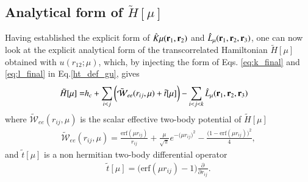 \documentclass[aip,jcp,reprint,noshowkeys,superscriptaddress]{revtex4-1}
\newcommand{\deriv}[3]{\frac{\partial^{#3} #1}{\partial {#2}^{#3}}}
\newcommand{\bri}[1]{{\bf r}_{#1}}
\begin{document}
\subsection{Analytical form of $\tilde{H}[\mu]$}
Having established the explicit form of $\hat{K}\mu(\bri{1},\bri{2})$ and $\hat{L}_\mu(\bri{1},\bri{2},\bri{3})$, one can now 
look at the explicit analytical form of the transcorrelated Hamiltonian $\tilde{H}[\mu]$ obtained with $u(r_{12};\mu)$,  
which, by injecting the form of Eqs. \eqref{eq:k_final} and \eqref{eq:l_final} in Eq.\eqref{ht_def_gu}, gives
\begin{equation}
  \begin{aligned}
 \label{eq:exp_ht_mu}
   \tilde{H}[\mu] = & h_c + \sum_{i<j} \bigg( \tilde{\mathcal{W}}_{ee}(r_{ij},\mu) + \tilde{t}[\mu] \bigg) - \sum_{i<j<k} \hat{L}_\mu(\bri{1},\bri{2},\bri{3})
  \end{aligned}
\end{equation}
where $ \tilde{\mathcal{W}}_{ee}(r_{ij},\mu)$ is the scalar effective two-body potential of  $\tilde{H}[\mu]$
\begin{equation}
 \begin{aligned}
 \tilde{\mathcal{W}}_{ee}(r_{ij},\mu)  =  \frac{\text{erf}(\mu r_{ij})}{r_{ij}} + \frac{\mu}{\sqrt{\pi}} e^{-\big(\mu r_{ij} \big)^2} - \frac{\bigg(1 -     \text{erf}(\mu r_{ij}) \bigg)^2}{4}, 
 \end{aligned}
\end{equation}
and $\tilde{t}[\mu]$ is a non hermitian two-body differential operator 
\begin{equation}
 \begin{aligned}
 \tilde{t}[\mu] =  \bigg( \text{erf}(\mu r_{ij}) - 1\bigg) \deriv{}{r_{ij}}{}.
 \end{aligned}
\end{equation}
\end{document}
